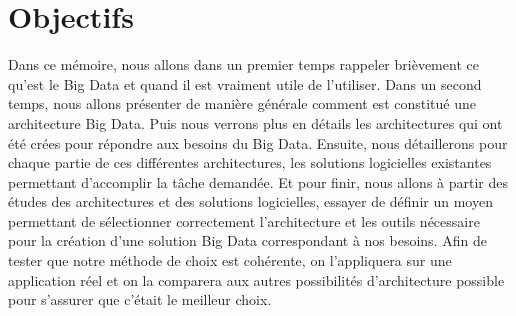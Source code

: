 \documentclass[12pt, twoside, openright]{report}
\begin{document}
\section*{Objectifs}



Dans ce mémoire, nous allons dans un premier temps rappeler brièvement ce qu'est le Big Data et quand il est vraiment utile de l'utiliser. Dans un second temps, nous allons présenter de manière générale comment est constitué une architecture Big Data. Puis nous verrons plus en détails les architectures qui ont été crées pour répondre aux besoins du Big Data. Ensuite, nous détaillerons pour chaque partie de ces différentes architectures, les solutions logicielles existantes permettant d'accomplir la tâche demandée. Et pour finir, nous allons à partir des études des architectures et des solutions logicielles, essayer de définir un moyen permettant de sélectionner correctement l'architecture et les outils nécessaire pour la création d'une solution Big Data correspondant à nos besoins. Afin de tester que notre méthode de choix est cohérente, on l'appliquera sur une application réel et on la comparera aux autres possibilités d'architecture possible pour s'assurer que c'était le meilleur choix.

\leavevmode\thispagestyle{empty}\newpage














\end{document}
